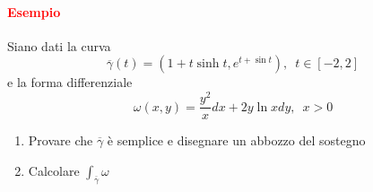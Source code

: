 \documentclass{article}
\begin{document}
\paragraph{\textcolor{red}{Esempio}}
Siano dati la curva 
\begin{equation*}
    \overline{\gamma}(t)=(1+t \sinh t, e^{t+\sin t}), \,\,\, t \in [-2,2]
\end{equation*}
e la forma differenziale
\begin{equation*}
    \omega(x,y)=\frac{y^2}{x} dx+2y \ln x dy,\,\,\, x >0
\end{equation*}
\begin{enumerate}
    \item Provare che $\overline{\gamma}$ è semplice e disegnare un abbozzo del sostegno
    \item Calcolare $\int_{\overline{\gamma}}\omega$
\end{enumerate}
\end{document}
